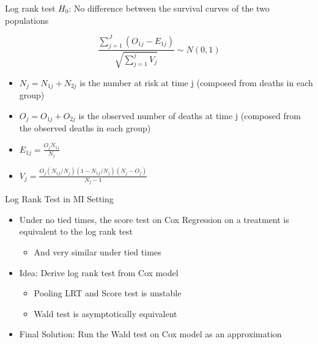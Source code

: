 \begin{frame}{Log rank test}
$H_0$: No difference between the survival curves of the two populations

$$\frac{\sum_{j=1}^{J}(O_{1j}-E_{1j})}{\sqrt{\sum_{j=1}^{j}V_{j}}}\sim N(0,1)$$
\begin{itemize}
 \item $N_j=N_{1j}+N_{2j}$ is the number at risk at time j (composed from deaths in each group)
 \item $O_j=O_{1j}+O_{2j}$ is the observed number of deaths at time j (composed from the observed deaths in each group)
 \item $E_{1j}=\frac{O_jN_{1j}}{N_j}$
 \item $V_j=\frac{O_j(N_{1j}/N_j)(1-N_{1j}/N_j)(N_{j}-O_{j})}{N_j -1}$
 \end{itemize}
\end{frame}

\begin{frame}{Log Rank Test in MI Setting}
 \begin{itemize}
 \item Under no tied times, the score test on
  Cox Regression on a treatment is equivalent to the
log rank test
\begin{itemize}
 \item And very similar under tied times
\end{itemize}
\item Idea: Derive log rank test from Cox model
\begin{itemize}
 \item Pooling LRT and Score test is unstable \cite{Marshall2009}
 \item Wald test is asymptotically equivalent
\end{itemize}
 \item Final Solution: Run the Wald test on Cox model as an approximation

 \end{itemize}
\end{frame}


